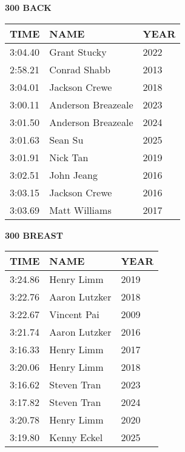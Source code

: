 \begin{minipage}[t]{0.48\textwidth}
\centering
\textbf{300 BACK}\\[0.05cm]
\begin{tabular}{@{}p{1.8cm}p{2.8cm}p{1.2cm}@{}}
\hline
\textbf{TIME} & \textbf{NAME} & \textbf{YEAR} \\
\hline
3:04.40 & Grant Stucky & 2022 \\
2:58.21 & Conrad Shabb & 2013 \\
3:04.01 & Jackson Crewe & 2018 \\
3:00.11 & Anderson Breazeale & 2023 \\
3:01.50 & Anderson Breazeale & 2024 \\
3:01.63 & Sean Su & 2025 \\
3:01.91 & Nick Tan & 2019 \\
3:02.51 & John Jeang & 2016 \\
3:03.15 & Jackson Crewe & 2016 \\
3:03.69 & Matt Williams & 2017 \\
\hline
\end{tabular}
\end{minipage}\hfill
\begin{minipage}[t]{0.48\textwidth}
\centering
\textbf{300 BREAST}\\[0.05cm]
\begin{tabular}{@{}p{1.8cm}p{2.8cm}p{1.2cm}@{}}
\hline
\textbf{TIME} & \textbf{NAME} & \textbf{YEAR} \\
\hline
3:24.86 & Henry Limm & 2019 \\
3:22.76 & Aaron Lutzker & 2018 \\
3:22.67 & Vincent Pai & 2009 \\
3:21.74 & Aaron Lutzker & 2016 \\
3:16.33 & Henry Limm & 2017 \\
3:20.06 & Henry Limm & 2018 \\
3:16.62 & Steven Tran & 2023 \\
3:17.82 & Steven Tran & 2024 \\
3:20.78 & Henry Limm & 2020 \\
3:19.80 & Kenny Eckel & 2025 \\
\hline
\end{tabular}
\end{minipage}

\vspace{0.4cm}

